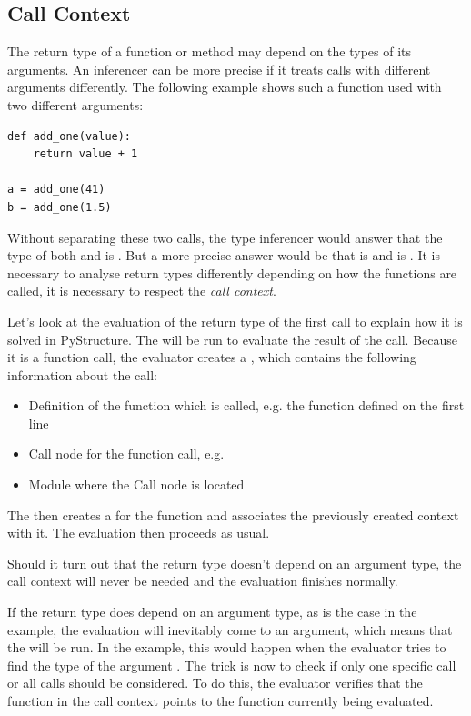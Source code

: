 \documentclass[12pt,halfparskip,DIV11,BCOR10mm]{scrreprt}
\begin{document}
\subsection{Call Context}
\label{call_context}

The return type of a function or method may depend on the types of its arguments. An inferencer can be more precise if it treats calls with different arguments differently. The following example shows such a function used with two different arguments:

\begin{lstlisting}
def add_one(value):
    return value + 1

a = add_one(41)
b = add_one(1.5)
\end{lstlisting}

Without separating these two calls, the type inferencer would answer that the type of both  and  is . But a more precise answer would be that  is  and  is . It is necessary to analyse return types differently depending on how the functions are called, it is necessary to respect the \emph{call context}.

Let's look at the evaluation of the return type of the first  call to explain how it is solved in PyStructure. The  will be run to evaluate the result of the call. Because it is a function call, the evaluator creates a , which contains the following information about the call:

\begin{itemize}
    \item Definition of the function which is called, e.g. the  function defined on the first line
    \item Call node for the function call, e.g. 
    \item Module where the Call node is located
\end{itemize}

The  then creates a  for the  function and associates the previously created context with it. The evaluation then proceeds as usual.

Should it turn out that the return type doesn't depend on an argument type, the call context will never be needed and the evaluation finishes normally.

If the return type does depend on an argument type, as is the case in the example, the evaluation will inevitably come to an argument, which means that the  will be run. In the example, this would happen when the evaluator tries to find the type of the argument . The trick is now to check if only one specific call or all calls should be considered. To do this, the evaluator verifies that the function in the call context points to the function currently being evaluated.
\end{document}
